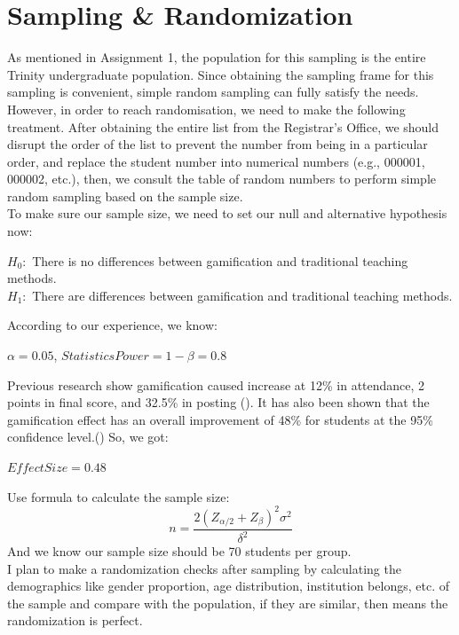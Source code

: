 \documentclass[12pt]{article} %
\begin{document}
\section*{Sampling \& Randomization}
\noindent As mentioned in Assignment 1, the population for this sampling is the entire Trinity undergraduate population. Since obtaining the sampling frame for this sampling is convenient, simple random sampling can fully satisfy the needs. However, in order to reach randomisation, we need to make the following treatment. After obtaining the entire list from the Registrar's Office, we should disrupt the order of the list to prevent the number from being in a particular order, and replace the student number into numerical numbers (e.g., 000001, 000002, etc.), then, we consult the table of random numbers to perform simple random sampling based on the sample size.\\

\noindent To make sure our sample size,  we need to set our null and alternative hypothesis now: 
\begin{center}
	$H_0:$ There is no differences between gamification and traditional teaching methods.\\
	$H_1:$ There are differences between gamification and traditional teaching methods.\\
\end{center}
\noindent According to our experience, we know: 
\begin{center}
	$\alpha = 0.05$, $StatisticsPower = 1 - \beta = 0.8$
\end{center}
Previous research show gamification caused increase at 12\% in attendance, 2 points in final score, and 32.5\% in posting (\cite{barata2013improving}). It has also been shown that the gamification effect has an overall improvement of 48\% for students at the 95\% confidence level.(\cite{kim2021effects}) So, we got:
\begin{center}
	$EffectSize = 0.48$
\end{center}
Use formula to calculate the sample size: 
\begin{equation}
	n = \frac{{2(Z_{\alpha/2} + Z_{\beta})^2 \sigma^2}}{{\delta^2}}
\end{equation}
\noindent And we know our sample size should be 70 students per group.\\

\noindent I plan to make a randomization checks after sampling by calculating the demographics like gender proportion,  age distribution, institution belongs, etc. of the sample and compare with the population, if they are similar, then means the randomization is perfect.\\
\end{document}
